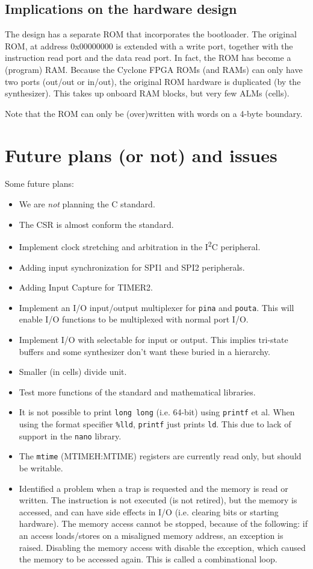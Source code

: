 \documentclass[12pt]{article}
\begin{document}
\subsection{Implications on the hardware design}
The design has a separate ROM that incorporates the bootloader. The original ROM, at address 0x00000000 is extended with a write port, together with the instruction read port and the data read port. In fact, the ROM has become a (program) RAM. Because the Cyclone FPGA ROMs (and RAMs) can only have two ports (out/out or in/out), the original ROM hardware is duplicated (by the synthesizer). This takes up onboard RAM blocks, but very few ALMs (cells). %

Note that the ROM can only be (over)written with words on a 4-byte boundary.

\section{Future plans (or not) and issues}
Some future plans:

\begin{itemize}
\item We are \emph{not} planning the C standard.
\item The CSR is almost conform the standard.
\item Implement clock stretching and arbitration in the I\textsuperscript{2}C peripheral.
\item Adding input synchronization for SPI1 and SPI2 peripherals.
\item Adding Input Capture for TIMER2.
\item Implement an I/O input/output multiplexer for \lstinline|pina| and \lstinline|pouta|. This will enable I/O functions to be multiplexed with normal port I/O.
\item Implement I/O with selectable for input or output. This implies tri-state buffers and some synthesizer don't want these buried in a hierarchy.
\item Smaller (in cells) divide unit.
\item Test more functions of the standard and mathematical libraries.
\item It is not possible to print \lstinline|long long| (i.e. 64-bit) using \lstinline|printf| et al. When using the format specifier \lstinline|%lld|, \lstinline|printf| just prints \lstinline|ld|. This due to lack of support in the \lstinline|nano| library.
\item The \lstinline|mtime| (MTIMEH:MTIME) registers are currently read only, but should be writable.
\item Identified a problem when a trap is requested and the memory is read or written. The instruction is not executed (is not retired), but the memory is accessed, and can have side effects in I/O (i.e. clearing bits or starting hardware). The memory access cannot be stopped, because of the following: if an access loads/stores on a misaligned memory address, an exception is raised. Disabling the memory access with disable the exception, which caused the memory to be accessed again. This is called a combinational loop.

\end{itemize}
\end{document}
